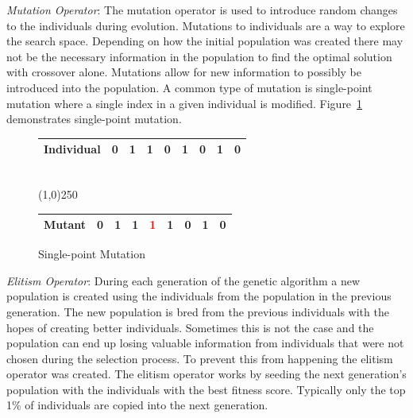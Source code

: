 \textit{Mutation Operator}: The mutation operator is used to introduce random changes to the individuals during evolution. Mutations to individuals are a way to explore the search space. Depending on how the initial population was created there may not be the necessary information in the population to find the optimal solution with crossover alone. Mutations allow for new information to possibly be introduced into the population. A common type of mutation is single-point mutation where a single index in a given individual is modified. Figure~\ref{fig:mutation} demonstrates single-point mutation.

\begin{figure}[H]
  \centering
  \begin{tabular}{ | l | l | l | l | l | l | l | l | l | }
    \hline
    Individual & 0 & 1 & 1 & 0 & 1 & 0 & 1 & 0 \\
    \hline
  \end{tabular}
  \\
  \vspace{3 mm}
  \line(1,0){250}
  \\
  \vspace{3 mm}
  \begin{tabular}{ | l | l | l | l | l | l | l | l | l | }
    \hline
    Mutant & 0 & 1 & 1 & \textcolor{red}{1} & 1 & 0 & 1 & 0 \\
    \hline
  \end{tabular}
  \caption{Single-point Mutation}
  \label{fig:mutation}
\end{figure}

\textit{Elitism Operator}: During each generation of the genetic algorithm a new population is created using the individuals from the population in the previous generation. The new population is bred from the previous individuals with the hopes of creating better individuals. Sometimes this is not the case and the population can end up losing valuable information from individuals that were not chosen during the selection process. To prevent this from happening the elitism operator was created. The elitism operator works by seeding the next generation's population with the individuals with the best fitness score. Typically only the top 1\% of individuals are copied into the next generation.
